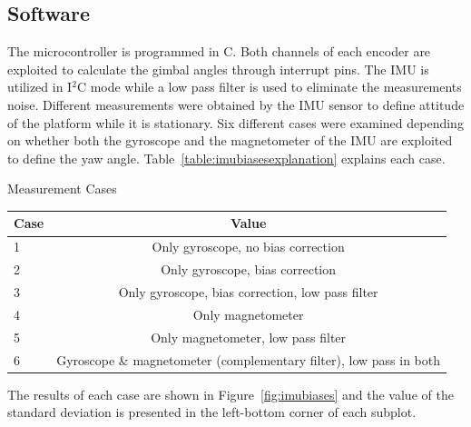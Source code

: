\documentclass[aerospace,article,submit,moreauthors,dvi2pdf]{Definitions/mdpi}
\begin{document}
\subsection{Software}

The microcontroller is programmed in C. Both channels of each encoder are exploited to calculate the gimbal angles through interrupt pins. The IMU is utilized in I$^2$C mode while a low pass filter is used to eliminate the measurements noise. 
Different measurements were obtained by the IMU sensor to define attitude of the platform while it is stationary. Six different cases were examined depending on whether both the gyroscope and the magnetometer of the IMU are exploited to define the yaw angle. Table~\ref{table:imubiasesexplanation} explains each case.

\begin{specialtable}[H] 
\caption{\label{table:imubiasesexplanation} Measurement Cases}
\begin{tabular}{lc}
\toprule
\textbf{Case}  & \textbf{Value}   \\
\midrule
1 & Only gyroscope, no bias correction\\
2 & Only gyroscope, bias correction  \\
3 & Only gyroscope, bias correction, low pass filter \\
4 & Only magnetometer\\
5 & Only magnetometer, low pass filter \\
6 & Gyroscope \& magnetometer (complementary filter), low pass in both \\
\bottomrule
\end{tabular}
\end{specialtable}
The results of each case are shown in Figure~\ref{fig:imubiases} and the value of the standard deviation is presented in the left-bottom corner of each subplot.
\end{document}
